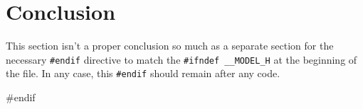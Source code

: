 \documentclass{article}
\begin{document}
  \section{Conclusion}

    This section isn’t a proper conclusion so much as a separate section for the
    necessary \verb|#endif| directive to match the \verb|#ifndef __MODEL_H| at the beginning
    of the file. In any case, this \verb|#endif| should remain after any code.

\begin{ccode}
#endif
\end{ccode}
\end{document}

